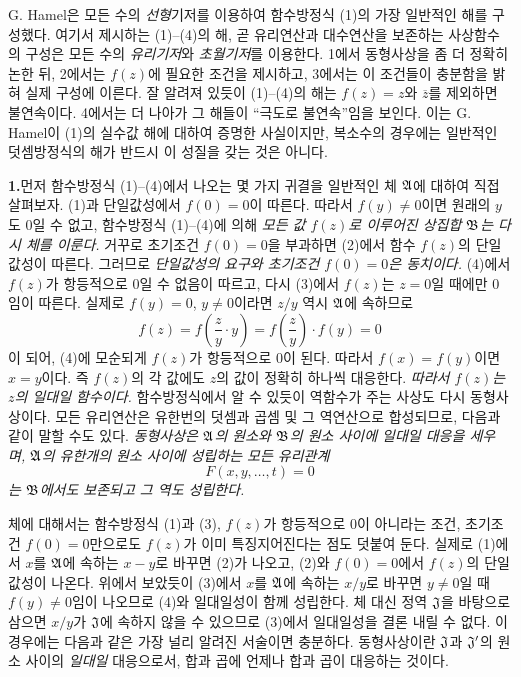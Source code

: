 G. Hamel은 모든 수의 \emph{선형}기저를 이용하여 함수방정식 (1)의 가장 일반적인 해를 구성했다. 여기서 제시하는 (1)--(4)의 해, 곧 유리연산과 대수연산을 보존하는 사상함수의 구성은 모든 수의 \emph{유리기저}와 \emph{초월기저}를 이용한다. 1에서 동형사상을 좀 더 정확히 논한 뒤, 2에서는 \(f(z)\)에 필요한 조건을 제시하고, 3에서는 이 조건들이 충분함을 밝혀 실제 구성에 이른다. 잘 알려져 있듯이 (1)--(4)의 해는 \(f(z)=z\)와 \(\overline z\)를 제외하면 불연속이다. 4에서는 더 나아가 그 해들이 ``극도로 불연속''임을 보인다. 이는 G. Hamel이 (1)의 실수값 해에 대하여 증명한 사실이지만, 복소수의 경우에는 일반적인 덧셈방정식의 해가 반드시 이 성질을 갖는 것은 아니다.

\medskip
\noindent\textbf{1.}\quad 먼저 함수방정식 (1)--(4)에서 나오는 몇 가지 귀결을 일반적인 체 \(\mathfrak A\)에 대하여 직접 살펴보자. (1)과 단일값성에서 \(f(0)=0\)이 따른다. 따라서 \(f(y)\ne0\)이면 원래의 \(y\)도 0일 수 없고, 함수방정식 (1)--(4)에 의해 \emph{모든 값 \(f(z)\)로 이루어진 상집합 \(\mathfrak B\)는 다시 체를 이룬다.} 거꾸로 초기조건 \(f(0)=0\)을 부과하면 (2)에서 함수 \(f(z)\)의 단일값성이 따른다. 그러므로 \emph{단일값성의 요구와 초기조건 \(f(0)=0\)은 동치이다.} (4)에서 \(f(z)\)가 항등적으로 0일 수 없음이 따르고, 다시 (3)에서 \(f(z)\)는 \(z=0\)일 때에만 0임이 따른다. 실제로 \(f(y)=0\), \(y\ne0\)이라면 \(z/y\) 역시 \(\mathfrak A\)에 속하므로
\[
f(z)=f\!\left(\frac{z}{y}\cdot y\right)=f\!\left(\frac{z}{y}\right)\cdot f(y)=0
\]
이 되어, (4)에 모순되게 \(f(z)\)가 항등적으로 0이 된다. 따라서 \(f(x)=f(y)\)이면 \(x=y\)이다. 즉 \(f(z)\)의 각 값에도 \(z\)의 값이 정확히 하나씩 대응한다. \emph{따라서 \(f(z)\)는 \(z\)의 일대일 함수이다.} 함수방정식에서 알 수 있듯이 역함수가 주는 사상도 다시 동형사상이다. 모든 유리연산은 유한번의 덧셈과 곱셈 및 그 역연산으로 합성되므로, 다음과 같이 말할 수도 있다. \emph{동형사상은 \(\mathfrak A\)의 원소와 \(\mathfrak B\)의 원소 사이에 일대일 대응을 세우며, \(\mathfrak A\)의 유한개의 원소 사이에 성립하는 모든 유리관계}
\[
F(x,y,\ldots,t)=0
\]
\emph{는 \(\mathfrak B\)에서도 보존되고 그 역도 성립한다.}

체에 대해서는 함수방정식 (1)과 (3), \(f(z)\)가 항등적으로 0이 아니라는 조건, 초기조건 \(f(0)=0\)만으로도 \(f(z)\)가 이미 특징지어진다는 점도 덧붙여 둔다. 실제로 (1)에서 \(x\)를 \(\mathfrak A\)에 속하는 \(x-y\)로 바꾸면 (2)가 나오고, (2)와 \(f(0)=0\)에서 \(f(z)\)의 단일값성이 나온다. 위에서 보았듯이 (3)에서 \(x\)를 \(\mathfrak A\)에 속하는 \(x/y\)로 바꾸면 \(y\ne0\)일 때 \(f(y)\ne0\)임이 나오므로 (4)와 일대일성이 함께 성립한다. 체 대신 정역 \(\mathfrak J\)을 바탕으로 삼으면 \(x/y\)가 \(\mathfrak J\)에 속하지 않을 수 있으므로 (3)에서 일대일성을 결론 내릴 수 없다. 이 경우에는 다음과 같은 가장 널리 알려진 서술이면 충분하다. 동형사상이란 \(\mathfrak J\)과 \(\mathfrak J'\)의 원소 사이의 \emph{일대일} 대응으로서, 합과 곱에 언제나 합과 곱이 대응하는 것이다.

